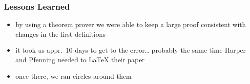\documentclass[dvipsnames,14pt,t]{beamer}
\begin{document}
  \begin{frame}[c]
  \frametitle{\LARGE Lessons Learned}

  \begin{itemize}
  \item by using a theorem prover we were able to keep a large 
  proof consistent with changes in the first definitions\bigskip
  \item it took us appr.~10 days to get to the error\ldots
  probably the same time Harper and Pfenning needed to \LaTeX{}
  their paper\bigskip 
  \item once there, we ran circles around them
  \end{itemize}

  \end{frame}
  
\end{document}
